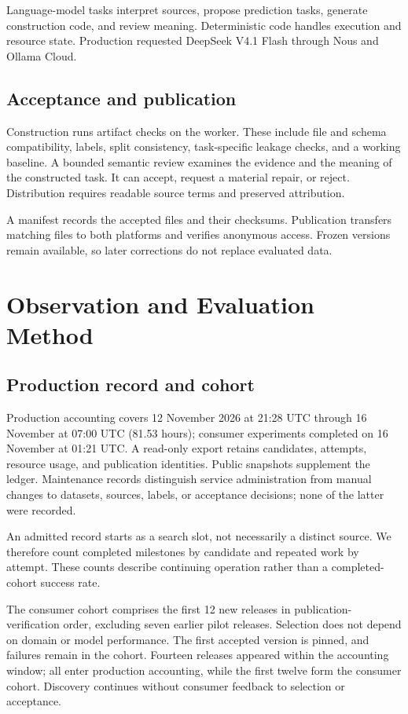 \documentclass[conference,10pt,letterpaper]{IEEEtran}
\begin{document}
Language-model tasks interpret sources, propose prediction tasks, generate construction code, and review meaning. Deterministic code handles execution and resource state. Production requested DeepSeek V4.1 Flash through Nous and Ollama Cloud.

\subsection{Acceptance and publication}
Construction runs artifact checks on the worker. These include file and schema compatibility, labels, split consistency, task-specific leakage checks, and a working baseline. A bounded semantic review examines the evidence and the meaning of the constructed task. It can accept, request a material repair, or reject. Distribution requires readable source terms and preserved attribution.

A manifest records the accepted files and their checksums. Publication transfers matching files to both platforms and verifies anonymous access. Frozen versions remain available, so later corrections do not replace evaluated data.

\section{Observation and Evaluation Method}
\subsection{Production record and cohort}
Production accounting covers 12 November 2026 at 21:28 UTC through 16 November at 07:00 UTC (81.53 hours); consumer experiments completed on 16 November at 01:21 UTC. A read-only export retains candidates, attempts, resource usage, and publication identities. Public snapshots supplement the ledger. Maintenance records distinguish service administration from manual changes to datasets, sources, labels, or acceptance decisions; none of the latter were recorded.

An admitted record starts as a search slot, not necessarily a distinct source. We therefore count completed milestones by candidate and repeated work by attempt. These counts describe continuing operation rather than a completed-cohort success rate.

The consumer cohort comprises the first 12 new releases in publication-verification order, excluding seven earlier pilot releases. Selection does not depend on domain or model performance. The first accepted version is pinned, and failures remain in the cohort. Fourteen releases appeared within the accounting window; all enter production accounting, while the first twelve form the consumer cohort. Discovery continues without consumer feedback to selection or acceptance.
\end{document}
